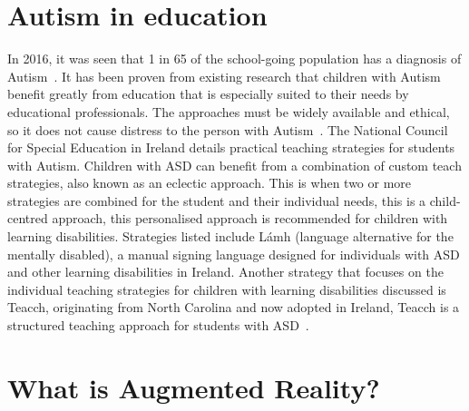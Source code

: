 \section{Autism in education} 

In 2016, it was seen that 1 in 65 of the school-going population has a diagnosis of Autism~\cite{Reference9}.
It has been proven from existing research that children with Autism benefit greatly from education that is especially suited to their needs by educational professionals. The approaches must be widely available and ethical, so it does not cause distress to the person with Autism~\cite{Reference10}. The National Council for Special Education in Ireland details practical teaching strategies for students with Autism. Children with ASD can benefit from a combination of custom teach strategies, also known as an eclectic approach. This is when two or more strategies are combined for the student and their individual needs, this is a child-centred approach, this personalised approach is recommended for children with learning disabilities. Strategies listed include Lámh (language alternative for the mentally disabled), a manual signing language designed for individuals with ASD and other learning disabilities in Ireland. Another strategy that focuses on the individual teaching strategies for children with learning disabilities discussed is Teacch, originating from North Carolina and now adopted in Ireland, Teacch is a structured teaching approach for students with ASD~\cite{Reference11}. 

\section{What is Augmented Reality?}

